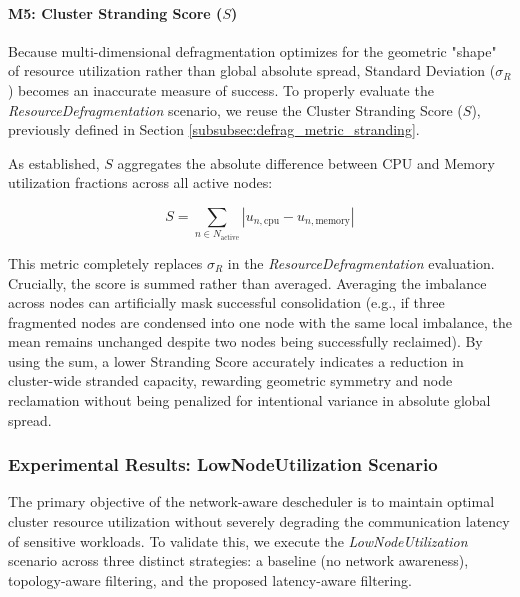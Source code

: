 \paragraph{M5: Cluster Stranding Score (\(S\))}
\label{subsubsec:netaware4_evaluationmetrics5}
Because multi-dimensional defragmentation optimizes for the geometric "shape" of resource utilization rather than global absolute spread, Standard Deviation (\(\sigma_R\)) becomes an inaccurate measure of success. To properly evaluate the \textit{ResourceDefragmentation} scenario, we reuse the Cluster Stranding Score (\(S\)), previously defined in Section \ref{subsubsec:defrag_metric_stranding}.

As established, \(S\) aggregates the absolute difference between CPU and Memory utilization fractions across all active nodes:

\[
S = \sum_{n \in N_{\text{active}}} \left| u_{n,\text{cpu}} - u_{n,\text{memory}} \right|
\]

This metric completely replaces \(\sigma_R\) in the \textit{ResourceDefragmentation} evaluation. Crucially, the score is summed rather than averaged. Averaging the imbalance across nodes can artificially mask successful consolidation (e.g., if three fragmented nodes are condensed into one node with the same local imbalance, the mean remains unchanged despite two nodes being successfully reclaimed). By using the sum, a lower Stranding Score accurately indicates a reduction in cluster-wide stranded capacity, rewarding geometric symmetry and node reclamation without being penalized for intentional variance in absolute global spread.

\subsubsection{Experimental Results: LowNodeUtilization Scenario}
\label{subsec:netaware4_resultanalysis1}
The primary objective of the network-aware descheduler is to maintain optimal cluster resource utilization without severely degrading the communication latency of sensitive workloads. To validate this, we execute the \textit{LowNodeUtilization} scenario across three distinct strategies: a baseline (no network awareness), topology-aware filtering, and the proposed latency-aware filtering.

